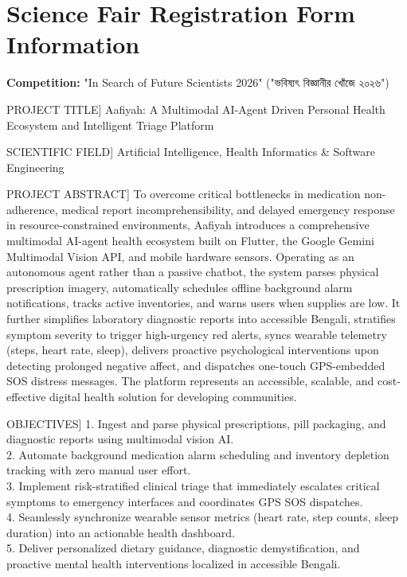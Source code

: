 \documentclass[12pt,a4paper,oneside]{report}
\begin{document}
\chapter{Science Fair Registration Form Information}
\textbf{Competition:} "In Search of Future Scientists 2026" ("ভবিষ্যৎ বিজ্ঞানীর খোঁজে ২০২৬")

\begin{highlightbox}[title=[FIELD 1] PROJECT TITLE]
Aafiyah: A Multimodal AI-Agent Driven Personal Health Ecosystem and Intelligent Triage Platform
\end{highlightbox}

\begin{highlightbox}[title=[FIELD 2] SCIENTIFIC FIELD]
Artificial Intelligence, Health Informatics \& Software Engineering
\end{highlightbox}

\begin{highlightbox}[title=[FIELD 3] PROJECT ABSTRACT]
To overcome critical bottlenecks in medication non-adherence, medical report incomprehensibility, and delayed emergency response in resource-constrained environments, Aafiyah introduces a comprehensive multimodal AI-agent health ecosystem built on Flutter, the Google Gemini Multimodal Vision API, and mobile hardware sensors. Operating as an autonomous agent rather than a passive chatbot, the system parses physical prescription imagery, automatically schedules offline background alarm notifications, tracks active inventories, and warns users when supplies are low. It further simplifies laboratory diagnostic reports into accessible Bengali, stratifies symptom severity to trigger high-urgency red alerts, syncs wearable telemetry (steps, heart rate, sleep), delivers proactive psychological interventions upon detecting prolonged negative affect, and dispatches one-touch GPS-embedded SOS distress messages. The platform represents an accessible, scalable, and cost-effective digital health solution for developing communities.
\end{highlightbox}

\begin{highlightbox}[title=[FIELD 4] OBJECTIVES]
1. Ingest and parse physical prescriptions, pill packaging, and diagnostic reports using multimodal vision AI.\\
2. Automate background medication alarm scheduling and inventory depletion tracking with zero manual user effort.\\
3. Implement risk-stratified clinical triage that immediately escalates critical symptoms to emergency interfaces and coordinates GPS SOS dispatches.\\
4. Seamlessly synchronize wearable sensor metrics (heart rate, step counts, sleep duration) into an actionable health dashboard.\\
5. Deliver personalized dietary guidance, diagnostic demystification, and proactive mental health interventions localized in accessible Bengali.
\end{highlightbox}
\end{document}
